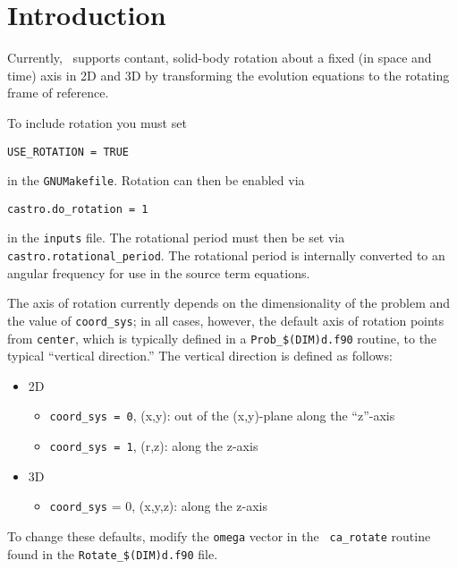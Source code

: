 \section{Introduction}

Currently, \castro\ supports contant, solid-body rotation about a fixed
(in space and time) axis in 2D and 3D by transforming the evolution
equations to the rotating frame of reference.  

To include rotation you must set
\begin{verbatim}
USE_ROTATION = TRUE
\end{verbatim}
in the {\tt GNUMakefile}.  Rotation can then be enabled via
\begin{verbatim}
castro.do_rotation = 1
\end{verbatim}
in the {\tt inputs} file.  The rotational period must then be set via
{\tt castro.rotational\_period}.  The rotational period is internally
converted to an angular frequency for use in the source term
equations.

The axis of rotation currently depends on the dimensionality of the
problem and the value of {\tt coord\_sys}; in all cases, however, the
default axis of rotation points from {\tt center}, which is typically
defined in a {\tt Prob\_\$(DIM)d.f90} routine, to the typical ``vertical
direction.''  The vertical direction is defined as follows:
\begin{itemize}
\item 2D
\begin{itemize}
\item {\tt coord\_sys = 0}, (x,y): out of the (x,y)-plane along the ``z''-axis
\item {\tt coord\_sys = 1}, (r,z): along the z-axis
\end{itemize}

\item 3D
\begin{itemize}
\item {\tt coord\_sys} = 0, (x,y,z): along the z-axis
\end{itemize}
\end{itemize}
To change these defaults, modify the {\tt omega} vector in the {\tt
  ca\_rotate} routine found in the {\tt Rotate\_\$(DIM)d.f90} file.


